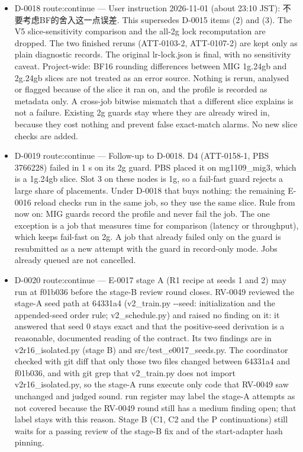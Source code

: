 \documentclass[11pt]{article}
\begin{document}
\begin{itemize}
\item D-0018 route:continue --- User instruction 2026-11-01 (about 23:10 JST): 不要考虑BF的舍入这一点误差. This supersedes D-0015 items (2) and (3). The V5 slice-sensitivity comparison and the all-2g lock recomputation are dropped. The two finished reruns (ATT-0103-2, ATT-0107-2) are kept only as plain diagnostic records. The original lr-lock.json is final, with no sensitivity caveat. Project-wide: BF16 rounding differences between MIG 1g.24gb and 2g.24gb slices are not treated as an error source. Nothing is rerun, analysed or flagged because of the slice it ran on, and the profile is recorded as metadata only. A cross-job bitwise mismatch that a different slice explains is not a failure. Existing 2g guards stay where they are already wired in, because they cost nothing and prevent false exact-match alarms. No new slice checks are added.
\item D-0019 route:continue --- Follow-up to D-0018. D4 (ATT-0158-1, PBS 3766228) failed in 1 s on its 2g guard. PBS placed it on mg1109\_mig3, which is a 1g.24gb slice. Slot 3 on these nodes is 1g, so a fail-fast guard rejects a large share of placements. Under D-0018 that buys nothing: the remaining E-0016 reload checks run in the same job, so they use the same slice. Rule from now on: MIG guards record the profile and never fail the job. The one exception is a job that measures time for comparison (latency or throughput), which keeps fail-fast on 2g. A job that already failed only on the guard is resubmitted as a new attempt with the guard in record-only mode. Jobs already queued are not cancelled.
\item D-0020 route:continue --- E-0017 stage A (R1 recipe at seeds 1 and 2) may run at f01b036 before the stage-B review round closes. RV-0049 reviewed the stage-A seed path at 64331a4 (v2\_train.py -{}-seed: initialization and the appended-seed order rule; v2\_schedule.py) and raised no finding on it: it answered that seed 0 stays exact and that the positive-seed derivation is a reasonable, documented reading of the contract. Its two findings are in v2r16\_isolated.py (stage B) and src/test\_e0017\_seeds.py. The coordinator checked with git diff that only those two files changed between 64331a4 and f01b036, and with git grep that v2\_train.py does not import v2r16\_isolated.py, so the stage-A runs execute only code that RV-0049 saw unchanged and judged sound. run register may label the stage-A attempts as not covered because the RV-0049 round still has a medium finding open; that label stays with this reason. Stage B (C1, C2 and the P continuations) still waits for a passing review of the stage-B fix and of the start-adapter hash pinning.

\end{itemize}
\end{document}
